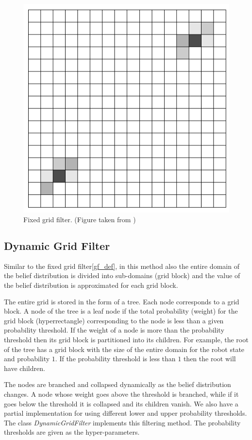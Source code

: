 \begin{figure}
\caption{Fixed grid filter. (Figure taken from \cite{prob})}
\includegraphics[width=\linewidth]{grid}
\end{figure}

\subsection{Dynamic Grid Filter}
Similar to the fixed grid filter\ref{gf_def}, in this method also the entire domain of the belief distribution is divided into sub-domains (grid block) and the value of the belief distribution is approximated for each grid block.

The entire grid is stored in the form of a tree. Each node corresponds to a grid block. A node of the tree is a leaf node if the total probability (weight) for the grid block (hyperrectangle) corresponding to the node is less than a given probability threshold. If the weight of a node is more than the probability threshold then its grid block is partitioned into its children. For example, the root of the tree has a grid block with the size of the entire domain for the robot state and probability $1$. If the probability threshold is less than $1$ then the root will have children.

The nodes are branched and collapsed dynamically as the belief distribution changes. A node whose weight goes above the threshold is branched, while if it goes below the threshold it is collapsed and its children vanish. We also have a partial implementation for using different lower and upper probability thresholds. The class \textit{DynamicGridFilter} implements this filtering method. The probability thresholds are given as the hyper-parameters.

